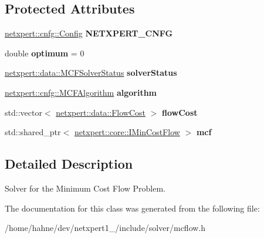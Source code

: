 \subsection*{Protected Attributes}
\begin{DoxyCompactItemize}
\item 
\hyperlink{structnetxpert_1_1cnfg_1_1Config}{netxpert\+::cnfg\+::\+Config} {\bfseries N\+E\+T\+X\+P\+E\+R\+T\+\_\+\+C\+N\+FG}\hypertarget{classnetxpert_1_1MinCostFlow_a7eb616387e700481e8bd38d0895a0b0c}{}\label{classnetxpert_1_1MinCostFlow_a7eb616387e700481e8bd38d0895a0b0c}

\item 
double {\bfseries optimum} = 0\hypertarget{classnetxpert_1_1MinCostFlow_ac97c5e0f6fea8cbb91ca6a1ee20a19ae}{}\label{classnetxpert_1_1MinCostFlow_ac97c5e0f6fea8cbb91ca6a1ee20a19ae}

\item 
\hyperlink{namespacenetxpert_1_1data_a0ea30f651c6cc7e7a6edd5a5cbe6346c}{netxpert\+::data\+::\+M\+C\+F\+Solver\+Status} {\bfseries solver\+Status}\hypertarget{classnetxpert_1_1MinCostFlow_a9a48b11bac35b930a4b6445fbf49e1ca}{}\label{classnetxpert_1_1MinCostFlow_a9a48b11bac35b930a4b6445fbf49e1ca}

\item 
\hyperlink{namespacenetxpert_1_1cnfg_aae922390a89b0c9af1bc2532428c5ef9}{netxpert\+::cnfg\+::\+M\+C\+F\+Algorithm} {\bfseries algorithm}\hypertarget{classnetxpert_1_1MinCostFlow_af32c8684a78aecf05eca2284a143ab7b}{}\label{classnetxpert_1_1MinCostFlow_af32c8684a78aecf05eca2284a143ab7b}

\item 
std\+::vector$<$ \hyperlink{structnetxpert_1_1data_1_1FlowCost}{netxpert\+::data\+::\+Flow\+Cost} $>$ {\bfseries flow\+Cost}\hypertarget{classnetxpert_1_1MinCostFlow_acb4f44eae2cd34f6bb759e38020f5caf}{}\label{classnetxpert_1_1MinCostFlow_acb4f44eae2cd34f6bb759e38020f5caf}

\item 
std\+::shared\+\_\+ptr$<$ \hyperlink{classnetxpert_1_1core_1_1IMinCostFlow}{netxpert\+::core\+::\+I\+Min\+Cost\+Flow} $>$ {\bfseries mcf}\hypertarget{classnetxpert_1_1MinCostFlow_acb8876e53342acf0f90a009ba7766935}{}\label{classnetxpert_1_1MinCostFlow_acb8876e53342acf0f90a009ba7766935}

\end{DoxyCompactItemize}


\subsection{Detailed Description}
Solver for the Minimum Cost Flow Problem. 

The documentation for this class was generated from the following file\+:\begin{DoxyCompactItemize}
\item 
/home/hahne/dev/netxpert1\+\_/include/solver/mcflow.\+h\end{DoxyCompactItemize}
